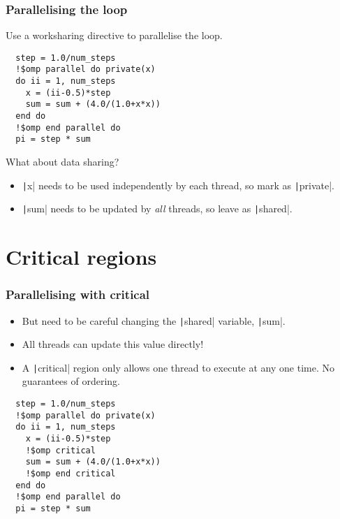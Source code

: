 \documentclass{beamer}
\begin{document}
\begin{frame}[fragile]
\frametitle{Parallelising the loop}

Use a worksharing directive to parallelise the loop.

\begin{verbatim}
  step = 1.0/num_steps
  !$omp parallel do private(x)
  do ii = 1, num_steps
    x = (ii-0.5)*step
    sum = sum + (4.0/(1.0+x*x))
  end do
  !$omp end parallel do
  pi = step * sum
\end{verbatim}

\vfill

What about data sharing?
\begin{itemize}
  \item \texttt|x| needs to be used independently by each thread, so mark as \texttt|private|.
  \item \texttt|sum| needs to be updated by \emph{all} threads, so leave as \texttt|shared|.
\end{itemize}

\end{frame}

\section{Critical regions}
\begin{frame}[fragile]
\frametitle{Parallelising with critical}
\begin{itemize}
  \item But need to be careful changing the \texttt|shared| variable, \texttt|sum|.
  \item All threads can update this value directly!
  \item A \texttt|critical| region only allows one thread to execute at any one time. No guarantees of ordering.
\end{itemize}

\begin{verbatim}
  step = 1.0/num_steps
  !$omp parallel do private(x)
  do ii = 1, num_steps
    x = (ii-0.5)*step
    !$omp critical
    sum = sum + (4.0/(1.0+x*x))
    !$omp end critical
  end do
  !$omp end parallel do
  pi = step * sum
\end{verbatim}

\end{frame}
\end{document}

